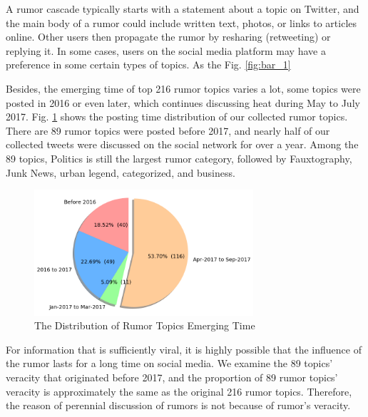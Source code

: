 \documentclass[conference]{IEEEtran}
\begin{document}
	
	
	A rumor cascade typically starts with a statement about a topic on Twitter, and the main body of a rumor could include written text, photos, or links to articles online. Other users then propagate the rumor by resharing (retweeting) or replying it. In some cases, users on the social media platform may have a preference in some certain types of topics. As the Fig. \ref{fig:bar_1}
	
	Besides, the emerging time of top 216 rumor topics varies a lot, some topics were posted in 2016 or even later, which continues discussing heat during May to July 2017. Fig. \ref{fig:pie_1} shows the posting time distribution of our collected rumor topics. There are 89 rumor topics were posted before 2017, and nearly half of our collected tweets were discussed on the social network for over a year. Among the 89 topics, Politics is still the largest rumor category, followed by Fauxtography, Junk News, urban legend, categorized, and business. 
	
	\begin{figure}[htbp]
		\centerline{\includegraphics[width=3.2in]{figures/figure_2.png}}
		\caption{The Distribution of Rumor Topics Emerging Time}
		\label{fig:pie_1}
	\end{figure}
	
	For information that is sufficiently viral, it is highly possible that the influence of the rumor lasts for a long time on social media. We examine the 89 topics' veracity that originated before 2017, and the proportion of 89 rumor topics' veracity is approximately the same as the original 216 rumor topics. Therefore, the reason of perennial discussion of rumors is not because of rumor's veracity. 
	
\end{document}

